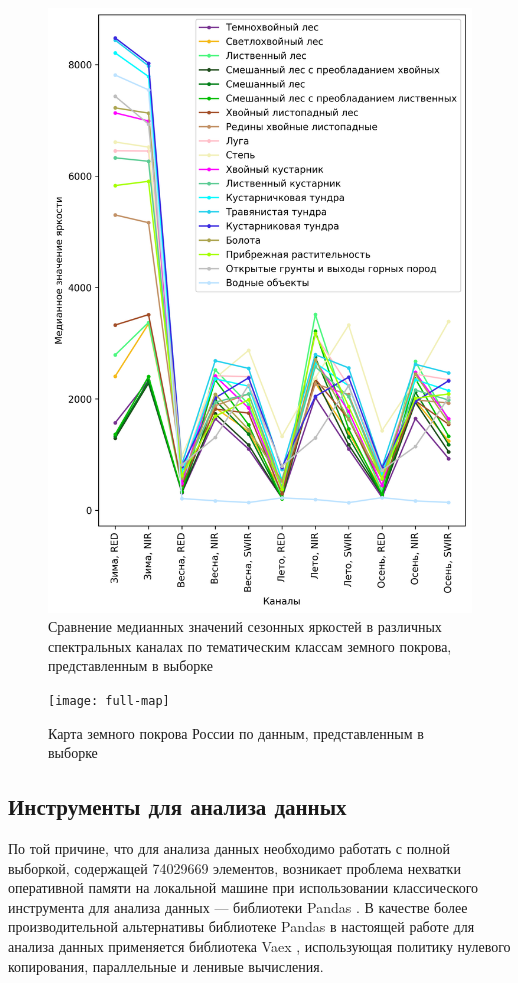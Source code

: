 \documentclass[14pt, a4paper, oneside]{extarticle}
\begin{document}
\begin{figure}[H]
    \caption{Сравнение медианных значений сезонных яркостей в различных спектральных каналах по тематическим классам земного покрова, представленным в выборке}
    \centering
    \includegraphics[]{class-comparison}
\end{figure}

\begin{landscape}
\begin{figure}[H]
    \caption{Карта земного покрова России по данным, представленным в выборке}
    \centering
    \texttt{[image: full-map]}
\end{figure}
\end{landscape}

\subsection{Инструменты для анализа данных}
По той причине, что для анализа данных необходимо работать с полной выборкой, содержащей 74029669 элементов, возникает проблема нехватки оперативной памяти на локальной машине при использовании классического инструмента для анализа данных --- библиотеки Pandas \cite{pandas}. В качестве более производительной альтернативы библиотеке Pandas в настоящей работе для анализа данных применяется библиотека Vaex \cite{vaex}, использующая политику нулевого копирования, параллельные и ленивые вычисления.
\end{document}

